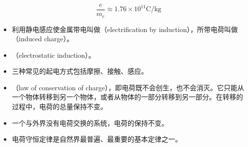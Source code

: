 \begin{itemize}
$$
\frac{e}{m_e}\approx1.76\times10^{11}\text{C}/\text{kg}
$$
\item 利用静电感应使金属带电叫做（electrification by induction），所带电荷叫做（induced charge）。
\item {}（electrostatic induction）。
\item 三种常见的起电方式包括摩擦、接触、感应。
\item {}（law of conservation of charge），即电荷既不会创生，也不会消灭。它只能从一个物体转移到另一个物体，或者从物体的一部分转移到另一部分。在转移的过程中，电荷的总量保持不变。
\item 一个与外界没有电荷交换的系统，电荷的保持不变。
\item 电荷守恒定律是自然界最普遍、最重要的基本定律之一。
\end{itemize}